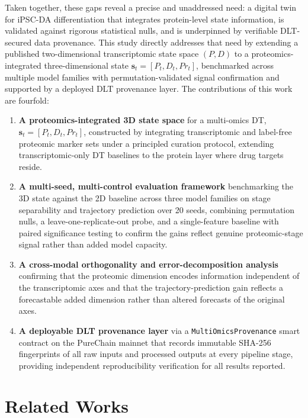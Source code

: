 \documentclass[5p,times,twocolumn]{elsarticle}
\begin{document}
Taken together, these gaps reveal a precise and
unaddressed need: a digital twin for iPSC-DA
differentiation that integrates protein-level state
information, is validated against rigorous statistical
nulls, and is underpinned by verifiable DLT-secured
data provenance.
This study directly addresses that need by extending
a published two-dimensional transcriptomic state
space $(P, D)$ to a proteomics-integrated
three-dimensional state
$\mathbf{s}_{t} = [P_{t}, D_{t}, Pr_{t}]$,
benchmarked across multiple model families with
permutation-validated signal confirmation and
supported by a deployed DLT provenance layer.
The contributions of this work are fourfold:

\begin{enumerate}
  \item \textbf{A proteomics-integrated 3D state space}
    for a multi-omics DT,
    $\mathbf{s}_{t} = [P_{t}, D_{t}, Pr_{t}]$,
    constructed by integrating transcriptomic and
    label-free proteomic marker sets under a principled
    curation protocol, extending transcriptomic-only DT
    baselines to the protein layer where drug targets
    reside.
  \item \textbf{A multi-seed, multi-control evaluation
    framework} benchmarking the 3D state against the 2D
    baseline across three model families on stage
    separability and trajectory prediction over 20 seeds,
    combining permutation nulls, a leave-one-replicate-out
    probe, and a single-feature baseline with paired
    significance testing to confirm the gains reflect
    genuine proteomic-stage signal rather than added model
    capacity.
  \item \textbf{A cross-modal orthogonality and
    error-decomposition analysis} confirming that the
    proteomic dimension encodes information independent of
    the transcriptomic axes and that the
    trajectory-prediction gain reflects a forecastable
    added dimension rather than altered forecasts of the
    original axes.
  \item \textbf{A deployable DLT provenance layer} via a
    \texttt{MultiOmicsProvenance} smart contract on the
    PureChain mainnet that records immutable SHA-256
    fingerprints of all raw inputs and processed outputs
    at every pipeline stage, providing independent
    reproducibility verification for all results reported.
\end{enumerate}


\section{Related Works}
\end{document}
